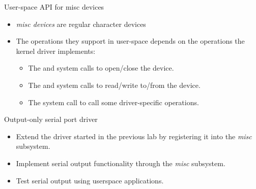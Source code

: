 \begin{frame}{User-space API for misc devices}
  \begin{itemize}
  \item {\em misc devices} are regular character devices
  \item The operations they support in user-space depends on the
    operations the kernel driver implements:
    \begin{itemize}
    \item The  and  system calls to
      open/close the device.
    \item The  and  system calls to
      read/write to/from the device.
    \item The  system call to call some driver-specific
      operations.
    \end{itemize}
  \end{itemize}
\end{frame}

\setuplabframe
{Output-only serial port driver}
{
  \begin{itemize}
  \item Extend the driver started in the previous lab by registering
    it into the {\em misc} subsystem.
  \item Implement serial output functionality through the {\em misc}
    subsystem.
  \item Test serial output using userspace applications.
  \end{itemize}
}
